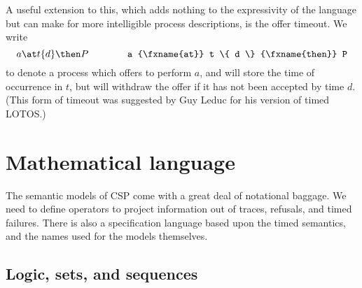 \documentclass[12pt]{article}
\begin{document}
A useful extension to this, which adds nothing to the expressivity of
the language but can make for more intelligible process descriptions,
is the offer timeout.  We write
\[
a \at t \{ d \} \then P \qquad \qquad
\hbox{\verb|a \at t \{ d \} \then P|}
\]
to denote a process which offers to perform $a$, and will store the
time of occurrence in $t$, but will withdraw the offer if it has not
been accepted by time $d$.  (This form of timeout was suggested
by Guy Leduc for his version of timed LOTOS.)

\section{Mathematical language}

The semantic models of CSP come with a great deal of notational
baggage.  We need to define operators to project information out of
traces, refusals, and timed failures.  There is also a specification
language based upon the timed semantics, and the names used for the
models themselves.

\subsection{Logic, sets, and sequences}
\end{document}
